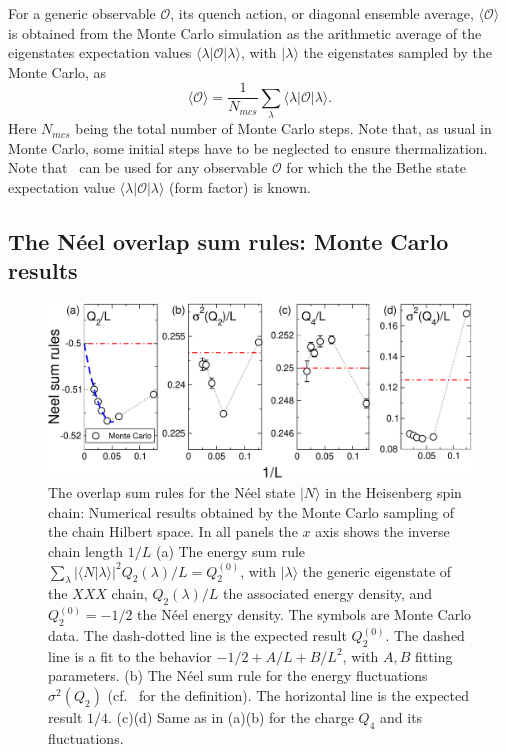 \documentclass[11pt]{iopart}
\begin{document}
For a generic observable ${\mathcal O}$, its quench action, or diagonal ensemble 
average, $\langle{\mathcal O}\rangle$ is obtained from the Monte Carlo simulation 
as the arithmetic average of the eigenstates expectation values $\langle\lambda
|{\mathcal O}|\lambda\rangle$, with $|\lambda\rangle$ the eigenstates sampled by 
the Monte Carlo, as 
%
\begin{equation}
\label{qamc-obs}
\langle{\mathcal O}\rangle=\frac{1}{N_{mcs}}\sum\limits_{\lambda}\langle\lambda|
{\mathcal O}|\lambda\rangle. 
\end{equation}
%
Here $N_{mcs}$ being the total number of Monte Carlo steps. Note that, as usual in 
Monte Carlo, some initial steps have to be neglected to ensure thermalization. 
Note that~ can be used for any observable ${\mathcal O}$ for which 
the the Bethe state expectation value $\langle\lambda|{\mathcal O}|\lambda\rangle$ 
(form factor) is known. 


\subsection{The N\'eel overlap sum rules: Monte Carlo results}
\label{sec:6.2}

\begin{figure}[t]
\begin{center}
\includegraphics[width=.9\textwidth]{./draft_figs/QAMC_Obs_Neel}
\end{center}
\caption{The overlap sum rules for the N\'eel state $|N\rangle$ in the 
 Heisenberg spin chain: Numerical results obtained by the Monte Carlo 
 sampling of the chain Hilbert space. In all panels the $x$ axis shows 
 the inverse chain length $1/L$ (a) The energy sum rule $\sum_\lambda|
 \langle N|\lambda\rangle|^2Q_2(\lambda)/L=Q^{(0)}_2$, with $|\lambda
 \rangle$ the generic eigenstate of the $XXX$ chain, $Q_2(\lambda)/L$ 
 the associated energy density, and $Q_2^{(0)}=-1/2$ the N\'eel energy 
 density. The symbols are Monte Carlo data. The dash-dotted line is the 
 expected result $Q_2^{(0)}$. The dashed line is a fit to the behavior 
 $-1/2+A/L+B/L^2$, with $A,B$ fitting parameters. (b) The N\'eel sum rule 
 for the energy fluctuations $\sigma^2(Q_2)$ (cf.~ for 
 the definition). The horizontal line is the expected result $1/4$. 
 (c)(d) Same as in (a)(b) for the charge $Q_4$ and its fluctuations. 
}
\label{fig3:neel-qamc-sr}
\end{figure}
\end{document}
